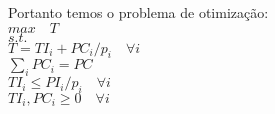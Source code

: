 \documentclass{book}
\begin{document}
Portanto temos o problema de otimização: \\


$max \quad T$ \\

$s.t.$ \\

$T = TI_{i} + PC_i/p_i \quad \forall i$ \\

$\sum_i PC_i = PC$ \\

$TI_i \leq PI_i/p_i \quad \forall i$ \\

$TI_i, PC_i \geq 0 \quad \forall i$

%
%




\end{document}

